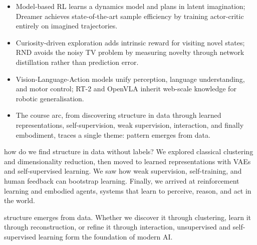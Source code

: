\vspace{1.5em}


\begin{itemize}
    \item Model-based RL learns a dynamics model and plans in latent imagination; Dreamer achieves state-of-the-art sample efficiency by training actor-critic entirely on imagined trajectories.
    \item Curiosity-driven exploration adds intrinsic reward for visiting novel states; RND avoids the noisy TV problem by measuring novelty through network distillation rather than prediction error.
    \item Vision-Language-Action models unify perception, language understanding, and motor control; RT-2 and OpenVLA inherit web-scale knowledge for robotic generalisation.
    \item The course arc, from discovering structure in data through learned representations, self-supervision, weak supervision, interaction, and finally embodiment, traces a single theme: pattern emerges from data.
\end{itemize}

\vspace{2.5em}

 how do we find structure in data without labels? We explored classical clustering and dimensionality reduction, then moved to learned representations with VAEs and self-supervised learning. We saw how weak supervision, self-training, and human feedback can bootstrap learning. Finally, we arrived at reinforcement learning and embodied agents, systems that learn to perceive, reason, and act in the world.


 structure emerges from data. Whether we discover it through clustering, learn it through reconstruction, or refine it through interaction, unsupervised and self-supervised learning form the foundation of modern AI.


\iffalse





